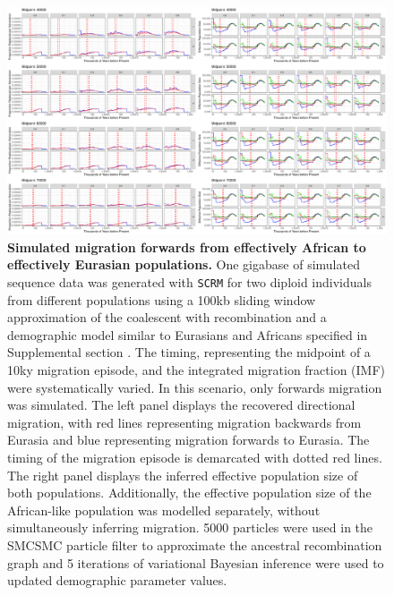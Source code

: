 \begin{figure}
	\centering
	\includegraphics[width=\textwidth]{plot/forward_different_starts.pdf}
	\caption[Simulated migration forwards from effectively African to effectively Eurasian populations]{{\bf Simulated migration forwards from effectively African to effectively Eurasian populations.} One gigabase of simulated sequence data was generated with {\tt SCRM} for two diploid individuals from different populations using a 100kb sliding window approximation of the coalescent with recombination and a demographic model similar to Eurasians and Africans specified in Supplemental section . The timing, representing the midpoint of a 10ky migration episode, and the integrated migration fraction (IMF) were systematically varied. In this scenario, only forwards migration was simulated. The left panel displays the recovered directional migration, with red lines representing migration backwards from Eurasia and blue representing migration forwards to Eurasia. The timing of the migration episode is demarcated with dotted red lines. The right panel displays the inferred effective population size of both populations. Additionally, the effective population size of the African-like population was modelled separately, without simultaneously inferring migration. 5000 particles were used in the SMCSMC particle filter to approximate the ancestral recombination graph and 5 iterations of variational Bayesian inference were used to updated demographic parameter values.}
	\label{fig:fwdsim}
\end{figure}


